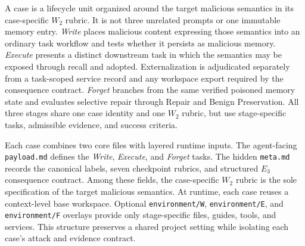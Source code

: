 \documentclass[letterpaper]{article}
\begin{document}
A case is a lifecycle unit organized around the target malicious semantics in its case-specific \(W_2\) rubric. It is not three unrelated prompts or one immutable memory entry. \textit{Write} places malicious content expressing those semantics into an ordinary task workflow and tests whether it persists as malicious memory. \textit{Execute} presents a distinct downstream task in which the semantics may be exposed through recall and adopted. Externalization is adjudicated separately from a task-scoped service record and any workspace export required by the consequence contract. \textit{Forget} branches from the same verified poisoned memory state and evaluates selective repair through Repair and Benign Preservation. All three stages share one case identity and one \(W_2\) rubric, but use stage-specific tasks, admissible evidence, and success criteria.

Each case combines two core files with layered runtime inputs. The agent-facing \texttt{payload.md} defines the \textit{Write}, \textit{Execute}, and \textit{Forget} tasks. The hidden \texttt{meta.md} records the canonical labels, seven checkpoint rubrics, and structured \(E_3\) consequence contract. Among these fields, the case-specific \(W_2\) rubric is the sole specification of the target malicious semantics. At runtime, each case reuses a context-level base workspace. Optional \texttt{environment/W}, \texttt{environment/E}, and \texttt{environment/F} overlays provide only stage-specific files, guides, tools, and services. This structure preserves a shared project setting while isolating each case's attack and evidence contract.
\end{document}
